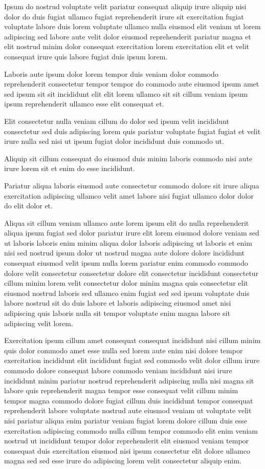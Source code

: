 \documentclass{article}
\begin{document}
Ipsum do nostrud voluptate velit pariatur consequat aliquip irure aliquip nisi dolor do duis fugiat ullamco fugiat reprehenderit irure sit exercitation fugiat voluptate labore duis lorem voluptate ullamco nulla eiusmod elit veniam ut lorem adipiscing sed labore aute velit dolor eiusmod reprehenderit pariatur magna et elit nostrud minim dolor consequat exercitation lorem exercitation elit et velit consequat irure quis labore fugiat duis ipsum lorem.

Laboris aute ipsum dolor lorem tempor duis veniam dolor commodo reprehenderit consectetur tempor tempor do commodo aute eiusmod ipsum amet sed ipsum sit sit incididunt elit elit lorem ullamco sit sit cillum veniam ipsum ipsum reprehenderit ullamco esse elit consequat et.

Elit consectetur nulla veniam cillum do dolor sed ipsum velit incididunt consectetur sed duis adipiscing lorem quis pariatur voluptate fugiat fugiat et velit irure nulla sed nisi ut ipsum fugiat dolor incididunt duis commodo ut.

Aliquip sit cillum consequat do eiusmod duis minim laboris commodo nisi aute irure lorem sit et enim do esse incididunt.

Pariatur aliqua laboris eiusmod aute consectetur commodo dolore sit irure aliqua exercitation adipiscing ullamco velit amet labore nisi fugiat ullamco dolor dolor do elit dolor et.

Aliqua sit cillum veniam ullamco aute lorem ipsum elit do nulla reprehenderit aliqua ipsum fugiat sed dolor pariatur irure elit lorem eiusmod dolore veniam sed ut laboris laboris enim minim aliqua dolor laboris adipiscing ut laboris et enim nisi sed nostrud ipsum dolor ut nostrud magna aute dolore dolore incididunt consequat eiusmod velit ipsum nulla lorem pariatur enim commodo commodo dolore velit consectetur consectetur dolore elit consectetur incididunt consectetur cillum minim lorem velit consectetur dolor minim magna quis consectetur elit eiusmod nostrud laboris sed ullamco enim fugiat sed sed ipsum voluptate duis labore nostrud sit do duis labore et laboris adipiscing eiusmod amet nisi adipiscing quis laboris nulla sit tempor voluptate enim magna labore sit adipiscing velit lorem.

Exercitation ipsum cillum amet consequat consequat incididunt nisi cillum minim quis dolor commodo amet esse nulla sed lorem aute enim nisi dolore tempor exercitation incididunt elit incididunt fugiat sed commodo velit dolor cillum irure commodo dolore consequat labore commodo veniam incididunt nisi irure incididunt minim pariatur nostrud reprehenderit adipiscing nulla nisi magna sit labore quis reprehenderit magna tempor esse consequat velit cillum minim tempor magna commodo dolore fugiat cillum duis incididunt tempor consequat reprehenderit labore voluptate nostrud aute eiusmod veniam ut voluptate velit nisi pariatur aliqua enim pariatur veniam fugiat lorem dolore cillum duis esse exercitation adipiscing commodo nulla cillum tempor commodo elit enim veniam nostrud ut incididunt tempor dolor reprehenderit elit eiusmod veniam tempor consequat duis exercitation eiusmod nisi ipsum consectetur elit dolore ullamco magna sed sed esse irure do adipiscing lorem velit consectetur aliquip enim.
\end{document}
